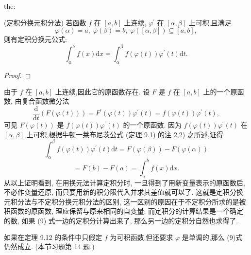 \begin{theorem}{}{the:}

\end{theorem}
 (定积分换元积分法) 若函数 \(f\) 在 \(\left\lbrack  {a,b}\right\rbrack\) 上连续, \({\varphi }^{\prime }\) 在 \(\left\lbrack  {\alpha ,\beta }\right\rbrack\) 上可积,且满足
\[
\varphi \left( \alpha \right)  = a,\;\varphi \left( \beta \right)  = b,\;\varphi \left( \left\lbrack  {\alpha ,\beta }\right\rbrack  \right)  \subseteq  \left\lbrack  {a,b}\right\rbrack  ,
\]
则有定积分换元公式:
\[
{\int }_{a}^{b}f\left( x\right) \mathrm{d}x = {\int }_{\alpha }^{\beta }f\left( {\varphi \left( t\right) }\right) {\varphi }^{\prime }\left( t\right) \mathrm{d}t. \tag{9}
\]
\begin{proof}

\end{proof}
由于 \(f\) 在 \(\left\lbrack  {a,b}\right\rbrack\) 上连续,因此它的原函数存在. 设 \(F\) 是 \(f\) 在 \(\left\lbrack  {a,b}\right\rbrack\) 上的一个原函数, 由复合函数微分法
\[
\frac{\mathrm{d}}{\mathrm{d}t}\left( {F\left( {\varphi \left( t\right) }\right) }\right)  = {F}^{\prime }\left( {\varphi \left( t\right) }\right) {\varphi }^{\prime }\left( t\right)  = f\left( {\varphi \left( t\right) }\right) {\varphi }^{\prime }\left( t\right) ,
\]
可见 \(F\left( {\varphi \left( t\right) }\right)\) 是 \(f\left( {\varphi \left( t\right) }\right) {\varphi }^{\prime }\left( t\right)\) 的一个原函数. 因为 \(f\left( {\varphi \left( t\right) }\right) {\varphi }^{\prime }\left( t\right)\) 在 \(\left\lbrack  {\alpha ,\beta }\right\rbrack\) 上可积,根据牛顿一莱布尼茨公式 (定理 9.1) 的注 2,2) 之所述,证得
\[
{\int }_{\alpha }^{\beta }f\left( {\varphi \left( t\right) }\right) {\varphi }^{\prime }\left( t\right) \mathrm{d}t = F\left( {\varphi \left( \beta \right) }\right)  - F\left( {\varphi \left( \alpha \right) }\right)
\]
\[
= F\left( b\right)  - F\left( a\right)  = {\int }_{a}^{b}f\left( x\right) \mathrm{d}x.
\]
从以上证明看到, 在用换元法计算定积分时, 一旦得到了用新变量表示的原函数后, 不必作变量还原, 而只要用新的积分限代入并求其差值就可以了. 这就是定积分换元积分法与不定积分换元积分法的区别, 这一区别的原因在于不定积分所求的是被积函数的原函数, 理应保留与原来相同的自变量; 而定积分的计算结果是一个确定的数, 如果 (9) 式一边的定积分计算出来了, 那么另一边的定积分自然也求得了.

\begin{remark}

\end{remark}
如果在定理 9.12 的条件中只假定 \(f\) 为可积函数,但还要求 \(\varphi\) 是单调的,那么 (9)式仍然成立. (本节习题第 14 题.)


